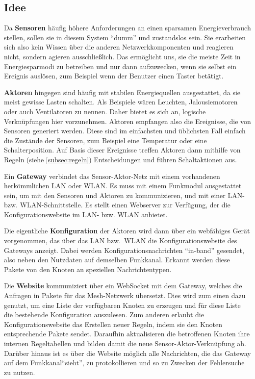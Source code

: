 \documentclass[conference]{IEEEtran}
\begin{document}
    \subsection{Idee}
        Da \textbf{Sensoren} häufig höhere Anforderungen an einen sparsamen
        Energieverbrauch stellen, sollen sie in diesem System \enquote{dumm} und zustandslos sein.
        Sie erarbeiten sich also kein Wissen über die anderen Netzwerkkomponenten
        und reagieren nicht, sondern agieren ausschließlich.
        Das ermöglicht uns, sie die meiste Zeit in Energiesparmodi zu betreiben
        und nur dann aufzuwecken, wenn sie selbst ein Ereignis auslösen,
        zum Beispiel wenn der Benutzer einen Taster betätigt.

        \textbf{Aktoren} hingegen sind häufig mit stabilen Energiequellen
        ausgestattet, da sie meist gewisse Lasten schalten.
        Als Beispiele wären Leuchten, Jalousiemotoren oder auch Ventilatoren
        zu nennen.
        Daher bietet es sich an, logische Verknüpfungen hier vorzunehmen.
        Aktoren empfangen also die Ereignisse, die von Sensoren generiert werden.
        Diese sind im einfachsten und üblichsten Fall einfach die Zustände
        der Sensoren, zum Beispiel eine Temperatur oder eine Schalterposition.
        Auf Basis dieser Ereignisse treffen Aktoren dann mithilfe von
        Regeln (siehe \ref{subsec:regeln}) Entscheidungen und führen Schaltaktionen aus.

        Ein \textbf{Gateway} verbindet das Sensor-Aktor-Netz mit einem
        vorhandenen herkömmlichen \ac{LAN} oder \ac{WLAN}.
        Es muss mit einem Funkmodul ausgestattet sein,
        um mit den Sensoren und Aktoren zu kommunizieren,
        und mit einer \ac{LAN}- bzw. \ac{WLAN}-Schnittstelle.
        Es stellt einen Webserver zur Verfügung,
        der die Konfigurationswebsite im \ac{LAN}- bzw. \ac{WLAN} anbietet.

        Die eigentliche \textbf{Konfiguration} der Aktoren wird dann
        über ein webfähiges Gerät vorgenommen,
        das über das \ac{LAN} bzw.\ \ac{WLAN} die
        Konfigurationswebsite des Gateways anzeigt.
        Dabei werden Konfigurationsnachrichten \enquote{in-band} gesendet,
        also neben den Nutzdaten auf demselben Funkkanal. Erkannt werden
        diese Pakete von den Knoten an speziellen Nachrichtentypen.
        
        Die \textbf{Website} kommuniziert über ein WebSocket mit dem Gateway,
        welches die Anfragen in Pakete für das Mesh-Netzwerk übersetzt.
        Dies wird zum einen dazu genutzt,
        um eine Liste der verfügbaren Knoten zu erzeugen und für diese
        Liste die bestehende Konfiguration auszulesen. Zum anderen erlaubt die Konfigurationswebsite
        das Erstellen neuer Regeln, indem sie den Knoten entsprechende Pakete sendet.
        Daraufhin aktualisieren die betroffenen Knoten ihre internen Regeltabellen und bilden
        damit die neue Sensor-Aktor-Verknüpfung ab.
        Darüber hinaus ist es über die Website möglich alle Nachrichten,
        die das Gateway auf dem Funkkanal\enquote{sieht},
        zu protokollieren und so zu Zwecken der Fehlersuche zu nutzen.
\end{document}
